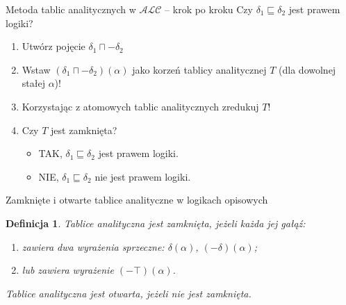 \documentclass{beamer}
\newtheorem{definicja}{Definicja}
\begin{document}
\begin{frame}{Metoda tablic analitycznych w $\mathcal{ALC}$ -- krok po kroku}
Czy $\delta_{1} \sqsubseteq \delta_{2}$ jest prawem logiki?
%
\begin{enumerate}
\item Utwórz pojęcie  $\delta_1 \sqcap - \delta_2$
%
\item Wstaw $(\delta_1 \sqcap - \delta_2)(\alpha)$ jako korzeń tablicy analitycznej $T$ (dla dowolnej stałej $\alpha$)!
%
\item Korzystając z atomowych tablic analitycznych zredukuj $T$!
%
\item Czy $T$ jest zamknięta?
%
\begin{itemize}
\item \textcolor[rgb]{0.00,1.00,0.00}{TAK}, $\delta_{1} \sqsubseteq \delta_{2}$ \textcolor[rgb]{0.00,1.00,0.00}{jest} prawem logiki.
%
\item \textcolor[rgb]{1.00,0.00,0.00}{NIE}, $\delta_{1} \sqsubseteq \delta_{2}$ \textcolor[rgb]{0.98,0.00,0.00}{nie jest} prawem logiki.
\end{itemize}
\end{enumerate}
\end{frame}

\begin{frame}{Zamknięte i otwarte tablice analityczne w logikach opisowych}
%
\begin{definicja}
Tablice analityczna jest \emph{zamknięta}, jeżeli każda jej gałąź:
\begin{enumerate}
\item zawiera dwa wyrażenia sprzeczne: $\delta(\alpha)$, $(- \delta)(\alpha)$;
\item lub zawiera wyrażenie $(- \top)(\alpha)$.
\end{enumerate}
Tablice analityczna jest \emph{otwarta}, jeżeli nie jest zamknięta.
\end{definicja}
\end{frame}

\end{document}

